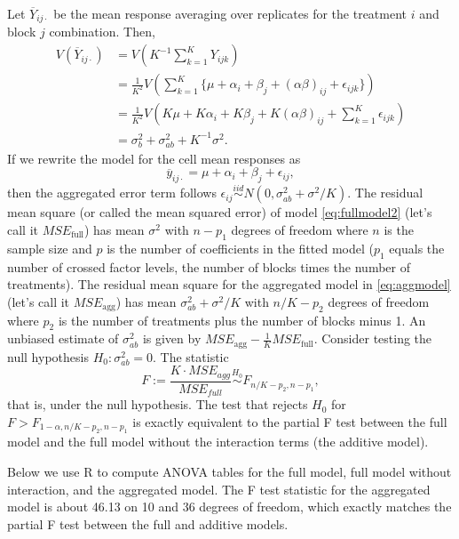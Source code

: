 \documentclass[
]{book}
\begin{document}
Let \(\overline Y_{ij\cdot}\) be the mean response averaging over replicates for the treatment \(i\) and block \(j\) combination. Then,
\begin{align*}
V(\overline Y_{ij\cdot}) &= V\left(K^{-1}\sum_{k=1}^K Y_{ijk}\right) \\
&= \frac{1}{K^2}V\left(\sum_{k=1}^K \{\mu+\alpha_i+\beta_j + (\alpha\beta)_{ij} + \epsilon_{ijk}\}\right)\\
& = \frac{1}{K^2}V\left(K\mu + K\alpha_i + K\beta_j + K(\alpha\beta)_{ij} + \sum_{k=1}^K \epsilon_{ijk}\right)\\
& = \sigma_b^2 + \sigma_{ab}^2 + K^{-1}\sigma^2.
\end{align*}
If we rewrite the model for the cell mean responses as
\begin{equation}
\overline y_{ij\cdot} = \mu + \alpha_i + \beta_j + \epsilon_{ij},
 \label{eq:aggmodel}
\end{equation}
then the aggregated error term follows \(\epsilon_{ij}\stackrel{iid}{\sim}N(0, \sigma_{ab}^2 + \sigma^2/K)\). The residual mean square (or called the mean squared error) of model \eqref{eq:fullmodel2} (let's call it \(MSE_{\text{full}}\)) has mean \(\sigma^2\) with \(n-p_1\) degrees of freedom where \(n\) is the sample size and \(p\) is the number of coefficients in the fitted model (\(p_1\) equals the number of crossed factor levels, the number of blocks times the number of treatments). The residual mean square for the aggregated model in \eqref{eq:aggmodel} (let's call it \(MSE_{\text{agg}}\)) has mean \(\sigma_{ab}^2 + \sigma^2/K\) with \(n/K-p_2\) degrees of freedom where \(p_2\) is the number of treatments plus the number of blocks minus 1. An unbiased estimate of \(\sigma_{ab}^2\) is given by \(MSE_{\text{agg}} - \frac{1}{K}MSE_{\text{full}}\). Consider testing the null hypothesis \(H_0:\sigma_{ab}^2 = 0\). The statistic
\[F := \frac{K\cdot MSE_{agg}}{MSE_{full}}\stackrel{H_0}{\sim}F_{n/K-p_2, n-p_1},\]
that is, under the null hypothesis. The test that rejects \(H_0\) for \(F > F_{1-\alpha,n/K-p_2, n-p_1}\) is exactly equivalent to the partial F test between the full model and the full model without the interaction terms (the additive model).

Below we use R to compute ANOVA tables for the full model, full model without interaction, and the aggregated model. The F test statistic for the aggregated model is about 46.13 on 10 and 36 degrees of freedom, which exactly matches the partial F test between the full and additive models.
\end{document}
